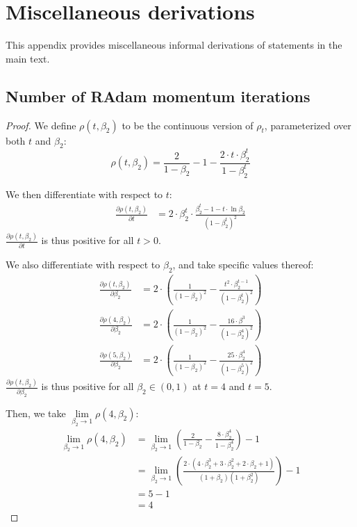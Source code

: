 {\section{Miscellaneous derivations}
\label{apx:misc-derivations}

This appendix provides miscellaneous informal derivations of statements in the main text.

\subsection{Number of RAdam momentum iterations}
\label{apx:misc-derivations-rhot-is-t4}

\rhotist*

\begin{proof}

We define $\rho(t, \beta_2)$ to be the continuous version of $\rho_t$, parameterized over both $t$ and $\beta_2$:
\begin{equation*}
    \rho(t, \beta_2) = \frac{2}{1 - \beta_2} - 1 - \frac{2 \cdot t \cdot \beta_2^t}{1 - \beta_2^t}
\end{equation*}

We then differentiate with respect to $t$:
\begin{align*}
    \frac{\partial \rho(t, \beta_2)}{\partial t} &= 2 \cdot \beta_2^t \cdot \frac{\beta_2^t - 1 - t \cdot \ln \beta_2}{\left( 1 - \beta_2^t \right)^2}
\end{align*}
$\frac{\partial \rho(t, \beta_2)}{\partial t}$ is thus positive for all $t > 0$.

We also differentiate with respect to $\beta_2$, and take specific values thereof:
\begin{align*}
    \frac{\partial \rho(t, \beta_2)}{\partial \beta_2} &= 2 \cdot \left( \frac{1}{(1 - \beta_2)^2} - \frac{t^2 \cdot \beta_2^{t - 1}}{(1 - \beta_2^t)^2} \right) \\
    \frac{\partial \rho(4, \beta_2)}{\partial \beta_2} &= 2 \cdot \left( \frac{1}{(1 - \beta_2)^2} - \frac{16 \cdot \beta^3}{(1 - \beta_2^4)^2} \right) \\
    \frac{\partial \rho(5, \beta_2)}{\partial \beta_2} &= 2 \cdot \left( \frac{1}{(1 - \beta_2)^2} - \frac{25 \cdot \beta_2^4}{(1 - \beta_2^5)^2} \right)
\end{align*}
$\frac{\partial \rho(t, \beta_2)}{\partial \beta_2}$ is thus positive for all $\beta_2 \in (0, 1)$ at $t = 4$ and $t = 5$.

Then, we take $\lim\limits_{\beta_2 \rightarrow 1} \rho(4, \beta_2)$:
\begin{align*}
    \lim\limits_{\beta_2 \rightarrow 1} \rho(4, \beta_2) &= \lim\limits_{\beta_2 \rightarrow 1} \left( \frac{2}{1 - \beta_2} - \frac{8 \cdot \beta_2^4}{1 - \beta_2^4} \right) - 1 \\
    &= \lim\limits_{\beta_2 \rightarrow 1} \left( \frac{2 \cdot \left( 4 \cdot \beta_2^3 + 3 \cdot \beta_2^2 + 2 \cdot \beta_2 + 1 \right)}{(1 + \beta_2) (1 + \beta_2^2)} \right) - 1 \\
    &= 5 - 1 \\
    &= 4
\end{align*}


\end{proof}}
